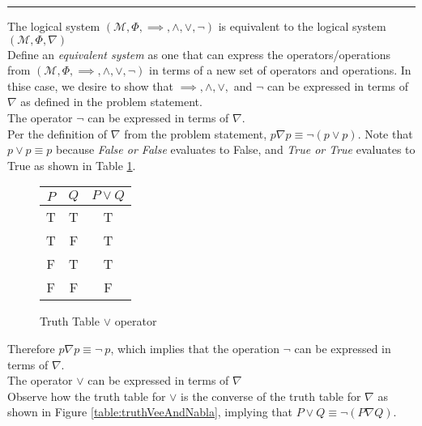 \documentclass{article}
\begin{document}
\noindent\rule{\textwidth}{0.4pt}\vspace{0.05in}
 The logical system $\left (\mathcal{M},\Phi,\implies, \wedge, \vee, \neg \right )$ is equivalent to the logical system $\left( \mathcal{M},\Phi,\nabla \right)$
\\[0.05in]  Define an \emph{equivalent system} as one that can express the operators/operations from $(\mathcal{M}, \Phi, \implies, \wedge, \vee, \neg)$ in terms of a new set of operators and operations. In thise case, we desire to show that $\implies, \wedge, \vee, $ and $\neg$ can be expressed in terms of $\nabla$ as defined in the problem statement.
\\[0.1in]  The operator $\neg$ can be expressed in terms of $\nabla$.
\\[0.05in] Per the definition of $\nabla$ from the problem statement, $p\nabla p \equiv \neg (p \vee p )$. Note that $p \vee p \equiv p$ because \emph{False or False} evaluates to False, and \emph{True or True} evaluates to True as shown in Table \ref{table:truthVee}.
\begin{figure}[h]
\centering
\begin{tabular}{c|c|c}
	$P$ & $Q$ & $P \vee Q$ \\ \hline 
	T   & T   & T \\
	T   & F   & T \\
	F   & T   & T \\
	F   & F   & F \\
\end{tabular}

\caption{Truth Table $\vee$ operator}
\label{table:truthVee}
\end{figure}
Therefore $p\nabla p \equiv \neg \ p$, which implies that the operation $\neg$ can be expressed in terms of $\nabla$. 
\\[0.1in]  The operator $\vee$ can be expressed in terms of $\nabla$
\\[0.05in]  Observe how the truth table for $\vee$ is the converse of the truth table for $\nabla$ as shown in Figure \ref{table:truthVeeAndNabla}, implying that $P\vee Q \equiv \neg(P\nabla Q)$. 
\end{document}
